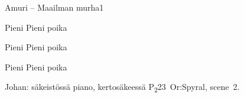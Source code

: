 \documentclass[11pt,a4paper]{article}
\begin{document}
\begin{mysong}{Amuri – Maailman murha}{1}
\begin{SBChorus}
  Pieni     Pieni poika
    
\end{SBChorus}


\begin{SBChorus}
  Pieni     Pieni poika
    
\end{SBChorus}


\begin{SBChorus}
  Pieni     Pieni poika
    
\end{SBChorus}


{\SBLyricNoteFont Johan: säkeistössä piano, kertosäkeessä
P\textsubscript{2}23~Or:Spyral, scene~2.}

\end{mysong}
\end{document}
